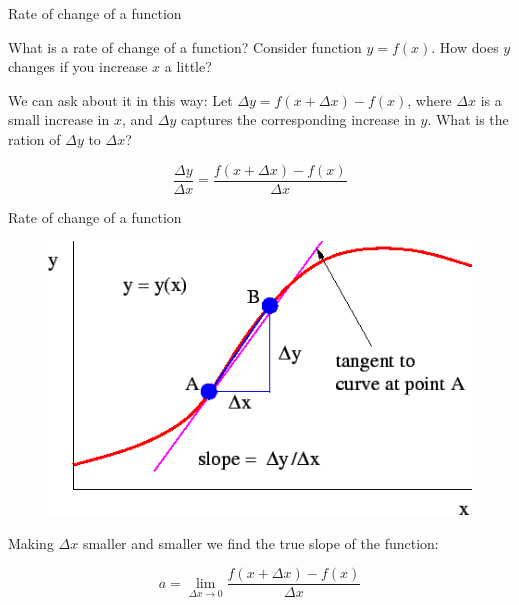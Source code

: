 \documentclass{beamer}
\begin{document}
\begin{frame}{Rate of change of a function}
	\begin{flushleft}
		
		What is a rate of change of a function? Consider function $y = f(x)$. How does $y$ changes if you increase $x$ a little?
		
		\bigskip
		
		We can ask about it in this way: Let  $\Delta y = f(x + \Delta x) - f(x)$, where $\Delta x$ is a small increase in $x$, and $\Delta y$ captures the corresponding increase in $y$. What is the ration of $\Delta y$ to $\Delta x$?
		
		\begin{equation}
			\frac{\Delta y}{\Delta x} = \frac{f(x + \Delta x) - f(x)}{\Delta x}
		\end{equation}
		
		
	\end{flushleft}
\end{frame}


\begin{frame}{Rate of change of a function}
	\begin{flushleft}
		
		\begin{figure}
			\centering
			\includegraphics[width=0.65\linewidth]{tangent_to_curve2}
		\end{figure}
			
			Making $\Delta x$ smaller and smaller we find the true slope of the function: 
			
		\begin{equation}
			a = \lim_{\Delta x \to 0} \frac{f(x + \Delta x) - f(x)}{\Delta x}
		\end{equation}
		
	\end{flushleft}
\end{frame}
\end{document}
